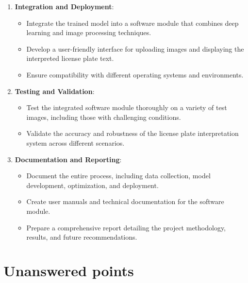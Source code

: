 \begin{enumerate}
	\item \textbf{Integration and Deployment}:
	\begin{itemize}
		\item Integrate the trained model into a software module that combines deep learning and image processing techniques.
		\item Develop a user-friendly interface for uploading images and displaying the interpreted license plate text.
		\item Ensure compatibility with different operating systems and environments.
	\end{itemize}
	
	\item \textbf{Testing and Validation}:
	\begin{itemize}
		\item Test the integrated software module thoroughly on a variety of test images, including those with challenging conditions.
		\item Validate the accuracy and robustness of the license plate interpretation system across different scenarios.
	\end{itemize}
	
	\item \textbf{Documentation and Reporting}:
	\begin{itemize}
		\item Document the entire process, including data collection, model development, optimization, and deployment.
		\item Create user manuals and technical documentation for the software module.
		\item Prepare a comprehensive report detailing the project methodology, results, and future recommendations.
	\end{itemize}
\end{enumerate}


\section{Unanswered points}


